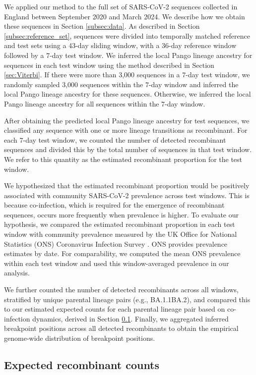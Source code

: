 \documentclass[11pt,oneside,letterpaper]{article}
\begin{document}
We applied our method to the full set of SARS-CoV-2 sequences collected in England between September 2020 and March 2024. We describe how we obtain these sequences in Section \ref{subsec:data}. As described in Section \ref{subsec:reference_set}, sequences were divided into temporally matched reference and test sets using a 43-day sliding window, with a 36-day reference window followed by a 7-day test window. We inferred the local Pango lineage ancestry for sequences in each test window using the method described in Section \ref{sec:Viterbi}. If there were more than 3,000 sequences in a 7-day test window, we randomly sampled 3,000 sequences within the 7-day window and inferred the local Pango lineage ancestry for these sequences. Otherwise, we inferred the local Pango lineage ancestry for all sequences within the 7-day window. 

After obtaining the predicted local Pango lineage ancestry for test sequences, we classified any sequence with one or more lineage transitions as recombinant. For each 7-day test window, we counted the number of detected recombinant sequences and divided this by the total number of sequences in that test window. We refer to this quantity as the estimated recombinant proportion for the test window.

We hypothesized that the estimated recombinant proportion would be positively associated with community SARS-CoV-2 prevalence across test windows. This is because co-infection, which is required for the emergence of recombinant sequences, occurs more frequently when prevalence is higher. To evaluate our hypothesis, we compared the estimated recombinant proportion in each test window with community prevalence measured by the UK Office for National Statistics (ONS) Coronavirus Infection Survey \cite{pouwels_community_2021}. ONS provides prevalence estimates by date. For comparability, we computed the mean ONS prevalence within each test window and used this window-averaged prevalence in our analysis.

We further counted the number of detected recombinants across all windows, stratified by unique parental lineage pairs (e.g., BA.1.1\text{--}BA.2), and compared this to our estimated expected counts for each parental lineage pair based on co-infection dynamics, derived in Section \ref{sec:expected}. Finally, we aggregated inferred breakpoint positions across all detected recombinants to obtain the empirical genome-wide distribution of breakpoint positions. 

\subsection{Expected recombinant counts}\label{sec:expected}
\end{document}
